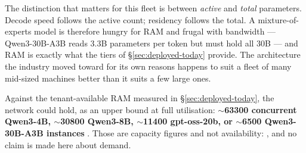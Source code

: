 \noindent The distinction that matters for this fleet is between \emph{active} and \emph{total}
parameters. Decode speed follows the active count; residency follows the total. A mixture-of-experts
model is therefore hungry for RAM and frugal with bandwidth --- Qwen3-30B-A3B reads 3.3B parameters
per token but must hold all 30B --- and RAM is exactly what the tiers of
\S\ref{sec:deployed-today} provide. The architecture the industry moved toward for its own reasons
happens to suit a fleet of many mid-sized machines better than it suits a few large ones.

Against the tenant-available RAM measured in \S\ref{sec:deployed-today}, the network could hold, as
an upper bound at full utilisation: \textbf{$\sim$\num{63300} concurrent Qwen3-4B, $\sim$\num{30800}
Qwen3-8B, $\sim$\num{11400} gpt-oss-20b, or $\sim$\num{6500} Qwen3-30B-A3B instances}
. Those are capacity figures and not availability: , and no claim is made here about demand.


